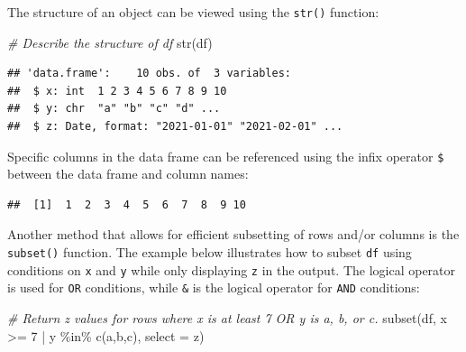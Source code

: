 \documentclass[
]{book}
\newenvironment{Shaded}{\begin{snugshade}}{\end{snugshade}}
\newcommand{\AttributeTok}[1]{\textcolor[rgb]{0.77,0.63,0.00}{#1}}
\newcommand{\CommentTok}[1]{\textcolor[rgb]{0.56,0.35,0.01}{\textit{#1}}}
\newcommand{\DecValTok}[1]{\textcolor[rgb]{0.00,0.00,0.81}{#1}}
\newcommand{\FunctionTok}[1]{\textcolor[rgb]{0.00,0.00,0.00}{#1}}
\newcommand{\NormalTok}[1]{#1}
\newcommand{\SpecialCharTok}[1]{\textcolor[rgb]{0.00,0.00,0.00}{#1}}
\newcommand{\StringTok}[1]{\textcolor[rgb]{0.31,0.60,0.02}{#1}}
\begin{document}
The structure of an object can be viewed using the \texttt{str()} function:

\begin{Shaded}
\begin{Highlighting}[]
\CommentTok{\# Describe the structure of df}
\FunctionTok{str}\NormalTok{(df)}
\end{Highlighting}
\end{Shaded}

\begin{verbatim}
## 'data.frame':    10 obs. of  3 variables:
##  $ x: int  1 2 3 4 5 6 7 8 9 10
##  $ y: chr  "a" "b" "c" "d" ...
##  $ z: Date, format: "2021-01-01" "2021-02-01" ...
\end{verbatim}

Specific columns in the data frame can be referenced using the infix operator \texttt{\$} between the data frame and column names:

\begin{Shaded}
\end{Shaded}

\begin{verbatim}
##  [1]  1  2  3  4  5  6  7  8  9 10
\end{verbatim}

Another method that allows for efficient subsetting of rows and/or columns is the \texttt{subset()} function. The example below illustrates how to subset \texttt{df} using conditions on \texttt{x} and \texttt{y} while only displaying \texttt{z} in the output. The logical operator \texttt{\textbar{}} is used for \texttt{OR} conditions, while \texttt{\&} is the logical operator for \texttt{AND} conditions:

\begin{Shaded}
\begin{Highlighting}[]
\CommentTok{\# Return z values for rows where x is at least 7 OR y is a, b, or c.}
\FunctionTok{subset}\NormalTok{(df, x }\SpecialCharTok{\textgreater{}=} \DecValTok{7} \SpecialCharTok{|}\NormalTok{ y }\SpecialCharTok{\%in\%} \FunctionTok{c}\NormalTok{(}\StringTok{\textquotesingle{}a\textquotesingle{}}\NormalTok{,}\StringTok{\textquotesingle{}b\textquotesingle{}}\NormalTok{,}\StringTok{\textquotesingle{}c\textquotesingle{}}\NormalTok{), }\AttributeTok{select =}\NormalTok{ z)}
\end{Highlighting}
\end{Shaded}
\end{document}
